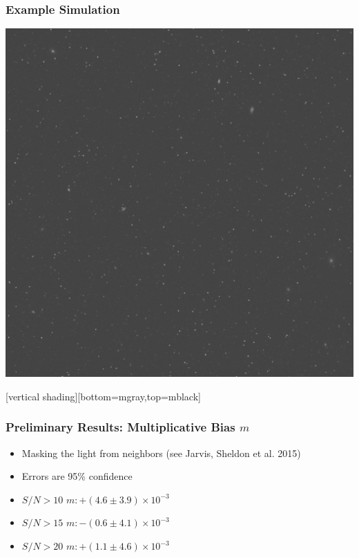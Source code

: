 \documentclass{beamer}
\begin{document}
{

    \frame
    {
        \frametitle{Example Simulation}
     
        \begin{center}
            \includegraphics[width=2.5\textwidth]{nbrsim-003e-000023-image.jpg}
            \newline
        \end{center}

    }
    [vertical shading][bottom=mgray,top=mblack]

}


\frame
{
    \frametitle{Preliminary Results: Multiplicative Bias $m$}

 
    \begin{itemize}

        \item Masking the light from neighbors (see Jarvis, Sheldon et al. 2015)

        \item Errors are 95\% confidence

        \item $S/N > 10$ $m: +(4.6 \pm 3.9) \times 10^{-3}$

        \item $S/N > 15$ $m: -(0.6 \pm 4.1) \times 10^{-3}$

        \item $S/N > 20$ $m: +(1.1 \pm 4.6) \times 10^{-3}$

    \end{itemize}

}
\end{document}
